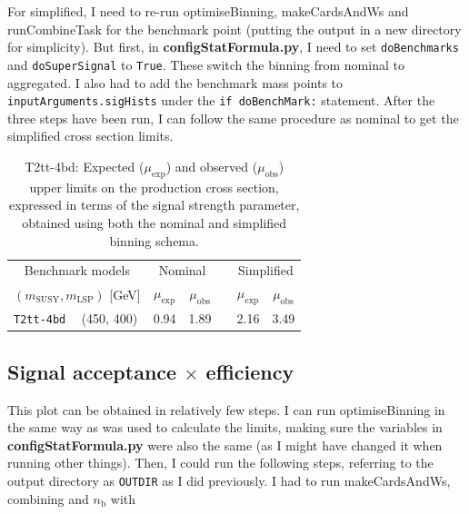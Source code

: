 For simplified, I need to re-run optimiseBinning, makeCardsAndWs and runCombineTask for the benchmark point (putting the output in a new directory for simplicity). But first, in \textbf{configStatFormula.py}, I need to set \texttt{doBenchmarks}  and \texttt{doSuperSignal} to \texttt{True}. These switch the binning from nominal to aggregated. I also had to add the benchmark mass points to \texttt{inputArguments.sigHists} under the \texttt{if doBenchMark:} statement. After the three steps have been run, I can follow the same procedure as nominal to get the simplified cross section limits.

\begin{table}[H]
  \centering
  \begin{tabular}{ llccccc }
    \hline
    \multicolumn{2}{c}{Benchmark models}    & \multicolumn{2}{c}{Nominal}
                                            &
                                            & \multicolumn{2}{c}{Simplified}             \\ [0.3ex]
    \cline{3-4}
    \cline{6-7}
    \multicolumn{2}{c}{$(m_{\text{SUSY}}, m_{\mathrm{LSP}})$ [GeV]}
                                            & $\mu_{\text{exp}}$
                                            & $\mu_{\text{obs}}$
                                            &
                                            & $\mu_{\text{exp}}$
                                            & $\mu_{\text{obs}}$                         \\ [0.3ex]
    \hline
    \texttt{T2tt-4bd} & (450, 400) & 0.94 & 1.89 & & 2.16 & 3.49 \\
        \hline
  \end{tabular}
  \caption{T2tt-4bd: Expected ($\mu_{\mathrm{exp}}$) and observed ($\mu_{\mathrm{obs}}$) upper limits on the production cross section, expressed in terms of the signal strength parameter, obtained using both the nominal and simplified binning schema.}
\end{table}

    
\subsection{Signal acceptance \texorpdfstring{$\times$}{x} efficiency}

This plot can be obtained in relatively few steps. I can run optimiseBinning in the same way as was used to calculate the limits, making sure the variables in \textbf{configStatFormula.py} were also the same (as I might have changed it when running other things). Then, I could run the following steps, referring to the output directory as \texttt{OUTDIR} as I did previously. I had to run makeCardsAndWs, combining \HT and $n_{\mathrm{b}}$ with

